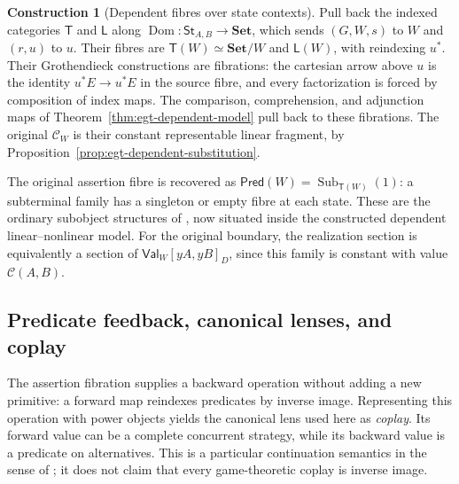\documentclass[11pt,a4paper]{article}
\numberwithin{equation}{section}
\theoremstyle{definition}
\newtheorem{construction}[construction]{Construction}
\theoremstyle{remark}
\theoremstyle{plain}
\begin{document}
\begin{construction}[Dependent fibres over state contexts]
\label{con:egt-state-dependent-fibres}
Pull back the indexed categories $\mathsf T$ and $\mathsf L$ along
$\operatorname{Dom}:\mathsf{St}_{A,B}\to\mathbf{Set}$, which sends
$(G,W,s)$ to $W$ and $(r,u)$ to $u$. Their fibres are
$\mathsf T(W)\simeq\mathbf{Set}/W$ and $\mathsf L(W)$, with
reindexing $u^*$. Their Grothendieck constructions are fibrations: the
cartesian arrow above $u$ is the identity $u^*E\to u^*E$ in the source
fibre, and every factorization is forced by composition of index maps.
The comparison, comprehension, and adjunction maps of
Theorem~\ref{thm:egt-dependent-model} pull back to these fibrations.
The original $\mathcal C_W$ is their constant representable linear
fragment, by Proposition~\ref{prop:egt-dependent-substitution}.
\end{construction}

The original assertion fibre is recovered as
$\mathsf{Pred}(W)=\operatorname{Sub}_{\mathsf T(W)}(1)$: a subterminal
family has a singleton or empty fibre at each state. These are the
ordinary subobject structures of
\citet[Chapters 1, 4, and 10]{Jacobs1999}, now situated inside the
constructed dependent linear--nonlinear model. For the original boundary,
the realization section is equivalently a section of
$\mathsf{Val}_W[yA,yB]_D$, since this family is constant with value
$\mathcal C(A,B)$.

\subsection{Predicate feedback, canonical lenses, and coplay}

The assertion fibration supplies a backward operation without adding
a new primitive: a forward map reindexes predicates by inverse image.
Representing this operation with power objects yields the canonical lens
used here as \emph{coplay}. Its forward value can be a complete concurrent
strategy, while its backward value is a predicate on alternatives. This is
a particular continuation semantics in the sense of
\citet{Capucci2023}; it does not claim that every game-theoretic coplay
is inverse image.
\end{document}
